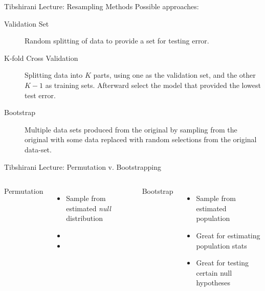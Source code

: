 \documentclass{beamer}
\begin{document}
\begin{frame}{Tibshirani Lecture: Resampling Methods}
	Possible approaches: \vspace{1em}
	\begin{description}
		\item[Validation Set] Random splitting of data to provide a set for testing error.
		\item[K-fold Cross Validation] Splitting data into $K$ parts, using one as the validation set, and the other $K-1$ as training sets. Afterward select the model that provided the lowest test error.
		\item[Bootstrap] Multiple data sets produced from the original by sampling from the original with some data replaced with random selections from the original data-set.
	\end{description}
\end{frame}

\begin{frame}{Tibshirani Lecture: Permutation v. Bootstrapping}
	\begin{columns}
	Permutation
		\begin{itemize}
			\item<1-> Sample from estimated \emph{null} distribution
			\item<2-> 
			\item<3->
		\end{itemize}
	
	Bootstrap
		\begin{itemize}
			\item<1-> Sample from estimated population
			\item<2-> Great for estimating population stats
			\item<3-> Great for testing certain null hypotheses
		\end{itemize}
	\end{columns}
\end{frame}
\end{document}
